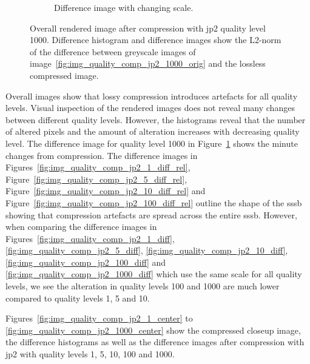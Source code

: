 \begin{figure}[htb]
\begin{subfigure}[b]{0.48\textwidth}
        \caption{Difference image with changing scale.}
        \label{fig:img_quality_comp_jp2_1000_diff_rel}
    \end{subfigure}
    \caption{Overall rendered image after compression with \gls{jp2} quality level 1000. Difference histogram and difference images show the L2-norm of the difference between greyscale images of image~\ref{fig:img_quality_comp_jp2_1000_orig} and the lossless compressed image.}
    \label{fig:img_quality_comp_jp2_1000}
\end{figure}

Overall images show that lossy compression introduces artefacts for all quality levels. Visual inspection of the rendered images does not reveal many changes between different quality levels. However, the histograms reveal that the number of altered pixels and the amount of alteration increases with decreasing quality level. The difference image for quality level 1000 in Figure~\ref{fig:img_quality_comp_jp2_1000_diff_rel} shows the minute changes from compression. The difference images in Figures~\ref{fig:img_quality_comp_jp2_1_diff_rel}, Figure~\ref{fig:img_quality_comp_jp2_5_diff_rel}, Figure~\ref{fig:img_quality_comp_jp2_10_diff_rel} and Figure~\ref{fig:img_quality_comp_jp2_100_diff_rel} outline the shape of the \gls{sssb} showing that compression artefacts are spread across the entire \gls{sssb}. However, when comparing the difference images in Figures~\ref{fig:img_quality_comp_jp2_1_diff}, \ref{fig:img_quality_comp_jp2_5_diff}, \ref{fig:img_quality_comp_jp2_10_diff}, \ref{fig:img_quality_comp_jp2_100_diff} and \ref{fig:img_quality_comp_jp2_1000_diff} which use the same scale for all quality levels, we see the alteration in quality levels \SI{100}{} and \SI{1000}{} are much lower compared to quality levels \SI{1}{}, \SI{5}{} and \SI{10}{}.

Figures~\ref{fig:img_quality_comp_jp2_1_center} to \ref{fig:img_quality_comp_jp2_1000_center} show the compressed closeup image, the difference histograms as well as the difference images after compression with \gls{jp2} with quality levels \SI{1}{}, \SI{5}{}, \SI{10}{}, \SI{100}{} and \SI{1000}{}.

